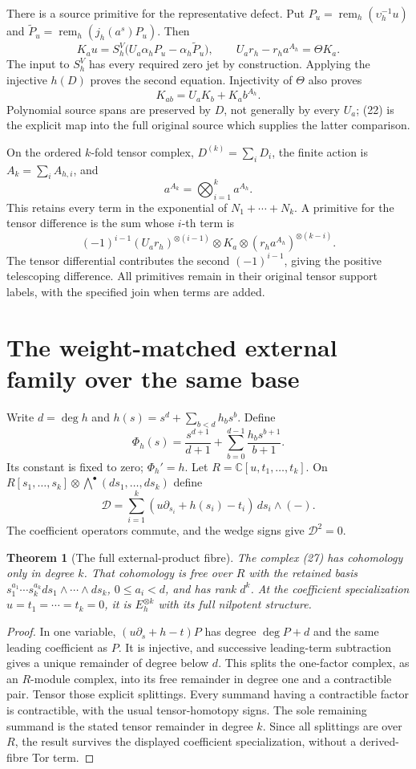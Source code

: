 \documentclass[11pt]{article}
\newtheorem{theorem}{Theorem}[section]
\begin{document}
There is a source primitive for the representative defect. Put $P_u=\operatorname{rem}_h(\upsilon_h^{-1}u)$ and $\widetilde P_u=\operatorname{rem}_h(j_h(a^s)P_u)$. Then
\[
 K_a u=S_h^V\bigl(U_a\alpha_hP_u-\alpha_h\widetilde P_u\bigr),
 \qquad U_ar_h-r_ha^{A_h}=\Theta K_a.
 \tag{22}
\]
The input to $S_h^V$ has every required zero jet by construction. Applying the injective $h(D)$ proves the second equation. Injectivity of $\Theta$ also proves
\[
 K_{ab}=U_aK_b+K_a b^{A_h}.
 \tag{23}
\]
Polynomial source spans are preserved by $D$, not generally by every $U_a$; (22) is the explicit map into the full original source which supplies the latter comparison.

On the ordered $k$-fold tensor complex, $D^{(k)}=\sum_iD_i$, the finite action is $A_k=\sum_iA_{h,i}$, and
\[
 a^{A_k}=\bigotimes_{i=1}^k a^{A_h}.
 \tag{24}
\]
This retains every term in the exponential of $N_1+\cdots+N_k$. A primitive for the tensor difference is the sum whose $i$-th term is
\[
 (-1)^{i-1}(U_ar_h)^{\otimes(i-1)}\otimes K_a
          \otimes(r_ha^{A_h})^{\otimes(k-i)}.
 \tag{25}
\]
The tensor differential contributes the second $(-1)^{i-1}$, giving the positive telescoping difference. All primitives remain in their original tensor support labels, with the specified join when terms are added.

\section{The weight-matched external family over the same base}
Write $d=\deg h$ and $h(s)=s^d+\sum_{b<d}h_bs^b$. Define
\[
 \Phi_h(s)=\frac{s^{d+1}}{d+1}+
           \sum_{b=0}^{d-1}\frac{h_bs^{b+1}}{b+1}.
 \tag{26}
\]
Its constant is fixed to zero; $\Phi_h'=h$. Let $R=\mathbb C[u,t_1,\ldots,t_k]$. On $R[s_1,\ldots,s_k]\otimes\bigwedge^\bullet(ds_1,\ldots,ds_k)$ define
\[
 \mathcal D=\sum_{i=1}^k
       (u\partial_{s_i}+h(s_i)-t_i)\,ds_i\wedge(-).
 \tag{27}
\]
The coefficient operators commute, and the wedge signs give $\mathcal D^2=0$.

\begin{theorem}[The full external-product fibre]
The complex (27) has cohomology only in degree $k$. That cohomology is free over $R$ with the retained basis $s_1^{a_1}\cdots s_k^{a_k}ds_1\wedge\cdots\wedge ds_k$, $0\le a_i<d$, and has rank $d^k$. At the coefficient specialization $u=t_1=\cdots=t_k=0$, it is $E_h^{\otimes k}$ with its full nilpotent structure.
\end{theorem}
\begin{proof}
In one variable, $(u\partial_s+h-t)P$ has degree $\deg P+d$ and the same leading coefficient as $P$. It is injective, and successive leading-term subtraction gives a unique remainder of degree below $d$. This splits the one-factor complex, as an $R$-module complex, into its free remainder in degree one and a contractible pair. Tensor those explicit splittings. Every summand having a contractible factor is contractible, with the usual tensor-homotopy signs. The sole remaining summand is the stated tensor remainder in degree $k$. Since all splittings are over $R$, the result survives the displayed coefficient specialization, without a derived-fibre Tor term.
\end{proof}
\end{document}
